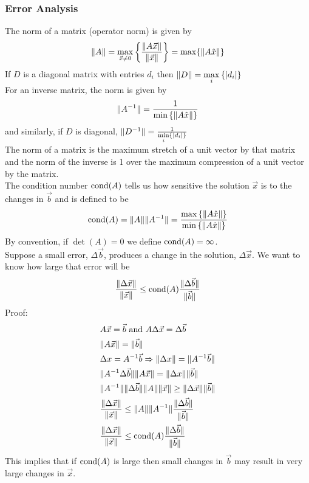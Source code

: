 \documentclass[11pt, fleqn]{article}
\begin{document}
\subsubsection{Error Analysis}
The norm of a matrix (operator norm) is given by
$$\|A\|=\max_{\vec{x}\neq0}\left\{ \frac{\|A\vec{x}\|}{\|\vec{x}\|} \right\}=\max\{\|A\hat{x}\|\}$$
If $D$ is a diagonal matrix with entries $d_i$ then $\|D\|=\max\limits_i\left\{ |d_i| \right\}$\\
For an inverse matrix, the norm is given by
$$\|A^{-1}\|=\frac{1}{\min\left\{ \|A\hat{x}\| \right\}}$$
and similarly, if $D$ is diagonal, $\|D^{-1}\|=\frac{1}{\min\limits_i\left\{ |d_i| \right\}}$\\
The norm of a matrix is the maximum stretch of a unit vector by that matrix and the norm of the inverse is 1 over the maximum compression of a unit vector by the matrix.\\
The condition number $\operatorname{cond}(A)$ tells us how sensitive the solution $\vec{x}$ is to the changes in $\vec{b}$ and is defined to be
$$\operatorname{cond}(A)=\|A\|\|A^{-1}\|=\frac{\max\left\{ \|A\hat{x}\| \right\}}{\min\left\{ \|A\hat{x}\| \right\}}$$
By convention, if $\det(A)=0$ we define $\operatorname{cond}(A)=\infty$.\\
Suppose a small error, $\Delta \vec{b}$, produces a change in the solution, $\Delta \vec{x}$. We want to know how large that error will be
$$\frac{\|\Delta \vec{x}\|}{\|\vec{x}\|}\leq\operatorname{cond}(A)\frac{\|\Delta\vec{b}\|}{\|\vec{b}\|}$$
Proof:
\begin{align*}
    &A\vec{x}=\vec{b}\text{ and }A\Delta\vec{x}=\Delta\vec{b}\\
    &\|A\vec{x}\|=\|\vec{b}\|\\
    &\Delta x=A^{-1}\vec{b}\Rightarrow \|\Delta x\|=\|A^{-1}\vec{b}\|\\
    &\|A^{-1}\Delta\vec{b}\|\|A\vec{x}\|=\|\Delta x\|\|\vec{b}\|\\
    &\|A^{-1}\|\|\Delta \vec{b}\|\|A\|\|\vec{x}\|\geq\|\Delta\vec{x}\|\|\vec{b}\|\\
    &\frac{\|\Delta\vec{x} \|}{\|\vec{x}\|}\leq\|A\|\|A^{-1}\|\frac{\|\Delta\vec{b}\|}{\|\vec{b}\|}\\
    &\frac{\|\Delta \vec{x}\|}{\|\vec{x}\|}\leq\operatorname{cond}(A)\frac{\|\Delta\vec{b}\|}{\|\vec{b}\|}
\end{align*}
This implies that if $\operatorname{cond}(A)$ is large then small changes in $\vec{b}$ may result in very large changes in $\vec{x}$.
\end{document}
